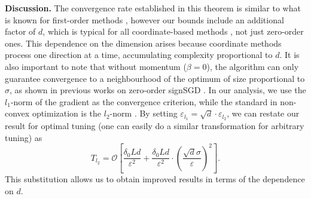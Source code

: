 \documentclass{article}
\theoremstyle{plain}
\theoremstyle{definition}
\theoremstyle{remark}
\begin{document}
\textbf{Discussion.} The convergence rate established in this theorem is similar to what is known for first-order methods \cite{bernstein2018signsgd, jin2020stochastic, safaryan2021stochastic, kornilov2025sign}, however our bounds include an additional factor of $d$, which is typical for all coordinate-based methods \cite{nesterov2012efficiency, richtarik2016distributed}, not just zero-order ones. This dependence on the dimension arises because coordinate methods process one direction at a time, accumulating complexity proportional to $d$.
It is also important to note that without momentum ($\beta = 0$), the algorithm can only guarantee convergence to a neighbourhood of the optimum of size proportional to $\sigma$, as shown in previous works on zero-order signSGD \cite{liu2019signsgd, kornilov2025sign}.
In our analysis, we use the $l_1$-norm of the gradient as the convergence criterion, while the standard in non-convex optimization is the $l_2$-norm \cite{ghadimi2013stochastic,ghadimi2016accelerated}. By setting $\varepsilon_{l_1} = \sqrt{d} \cdot \varepsilon_{l_2}$, we can restate our result for optimal tuning (one can easily do a similar transformation for arbitrary tuning) as
\begin{equation*}
    T_{l_2} = \mathcal{O} \left[ \frac{\delta_0 L d}{\varepsilon^2} + \frac{\delta_0 L d}{\varepsilon^2} \cdot \left( \frac{\sqrt{d} \sigma}{\varepsilon} \right)^2\right] .
\end{equation*}
This substitution allows us to obtain improved results in terms of the dependence on $d$.


\end{document}
